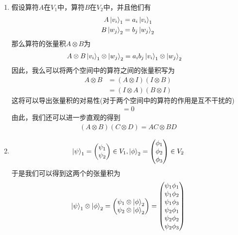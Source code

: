\documentclass{article}
\begin{document}
\begin{enumerate}
\begin{align*}
	      \end{align*}
	\item 假设算符$A$在$V_1$中，算符$B$在$V_2$中，并且他们有
	      \begin{align*}
		      A\ket{v_i}_1 & =a_i\ket{v_i}_1 \\
		      B\ket{w_j}_2 & =b_j\ket{w_j}_2
	      \end{align*}
	      那么算符的张量积$A\otimes B$为
	      \begin{align*}
		      A\otimes B \ket{v_i}_1\otimes \ket{w_j}_2 & =a_ib_j\ket{v_i}_1\otimes \ket{w_j}_2
	      \end{align*}
	      因此，我么可以将两个空间中的算符之间的张量积写为
	      \begin{align*}
		      A\otimes B & =(A\otimes I)(I\otimes B) \\
		                 & =(I\otimes A)(B\otimes I)
	      \end{align*}
	      这将可以导出张量积的对易性(对于两个空间中的算符的作用是互不干扰的)
	      \begin{align*}
		      [A\otimes I,I\otimes B]=0
	      \end{align*}
	      由此，我们还可以进一步直观的得到
	      \begin{align*}
		      (A\otimes B)(C\otimes D)=AC\otimes BD
	      \end{align*}
	\item
	      \begin{align*}
		      \ket{\psi}_1=
		      \begin{pmatrix}
			      \psi_1 \\ \psi_2
		      \end{pmatrix}\in V_1
		      ,\ket{\phi}_2=
		      \begin{pmatrix}
			      \phi_1 \\ \phi_2\\ \phi_3
		      \end{pmatrix}\in V_2
	      \end{align*}
	      于是我们可以得到这两个的张量积为
	      \begin{align*}
		      \ket{\psi}_1\otimes\ket{\phi}_2
		      =
		      \begin{pmatrix}
			      \psi_1\otimes\ket{\phi}_2 \\ \psi_2\otimes\ket{\phi}_2
		      \end{pmatrix}
		      =
		      \begin{pmatrix}
			      \psi_1\phi_1 \\\psi_1\phi_2\\\psi_1\phi_3\\\psi_2\phi_1\\\psi_2\phi_2\\\psi_2\phi_3

\end{pmatrix}
\end{align*}
\end{enumerate}
\end{document}
